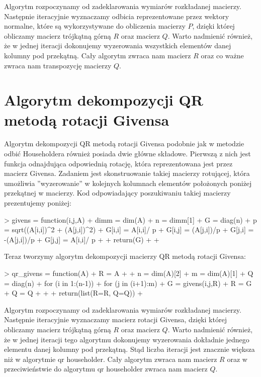 \documentclass[12pt,a4paper]{report}
\newcommand{\mx}[1]{{#1}}
\begin{document}
Algorytm rozpoczynamy od zadeklarowania wymiarów rozkładanej macierzy. Następnie iteracyjnie wyznaczamy odbicia reprezentowane przez wektory normalne, które są wykorzystywane do obliczenia macierzy $\mx{P}$, dzięki której obliczamy macierz trójkątną górną $\mx{R}$ oraz macierz $\mx{Q}$. Warto nadmienić również, że w jednej iteracji dokonujemy wyzerowania wszystkich elementów danej kolumny pod przekątną. Cały algorytm zwraca nam macierz $\mx{R}$ oraz co ważne zwraca nam transpozycję macierzy $\mx{Q}$.

\section{Algorytm dekompozycji QR metodą rotacji Givensa}

Algorytm dekompozycji QR metodą rotacji Givensa podobnie jak w metodzie odbić Householdera również posiada dwie główne składowe. Pierwszą z nich jest funkcja odnajdująca odpowiednią rotację, która reprezentowana jest przez macierz Givensa. Zadaniem jest skonstruowanie takiej macierzy rotującej, która umożliwia ''wyzerowanie'' w kolejnych kolumnach elementów położonych poniżej przekątnej w macierzy. Kod odpowiadający poszukiwaniu takiej macierzy prezentujemy poniżej:

\begin{Schunk}
\begin{Sinput}
> givens = function(i,j,A){
+   dimm = dim(A)
+   n = dimm[1]
+   G = diag(n)
+   p = sqrt((A[i,i])^2 + (A[j,i])^2)
+   G[i,i] = A[i,i]/ p
+   G[i,j] = (A[j,i])/p
+   G[j,i] = -(A[j,i])/p
+   G[j,j] = A[i,i]/ p
+   
+ return(G)  
+   
+ }
\end{Sinput}
\end{Schunk}

Teraz tworzymy algorytm dekompozycji macierzy QR metodą rotacji Givensa:

\begin{Schunk}
\begin{Sinput}
> qr_givens = function(A){
+   R = A
+   
+   n = dim(A)[2]
+   m = dim(A)[1]
+   Q = diag(n)
+   for (i in 1:(n-1)) {
+     for (j in (i+1):m) {
+       G = givens(i,j,R)
+       R = G %
+       Q = Q %
+     }
+   }
+   return(list(R=R, Q=Q))
+ }
\end{Sinput}
\end{Schunk}

Algorytm rozpoczynamy od zadeklarowania wymiarów rozkładanej macierzy. Następnie iteracyjnie wyznaczamy macierz rotacji Givensa, dzięki której obliczamy macierz trójkątną górną $\mx{R}$ oraz macierz $\mx{Q}$. Warto nadmienić również, że w jednej iteracji tego algorytmu dokonujemy wyzerowania dokładnie jednego elementu danej kolumny pod przekątną. Stąd liczba iteracji jest znacznie większa niż w algorytmie qr householder. Cały algorytm zwraca nam macierz $\mx{R}$ oraz w przeciwieństwie do algorytmu qr householder zwraca nam macierz $\mx{Q}$.
\end{document}
